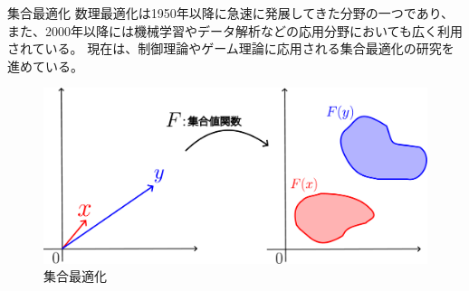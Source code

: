 \documentclass[aspectratio=169, dvipdfmx, 11pt]{beamer} %
\begin{document}
\begin{frame}{集合最適化}
  数理最適化は1950年以降に急速に発展してきた分野の一つであり、また、2000年以降には機械学習やデータ解析などの応用分野においても広く利用されている。
  現在は、制御理論やゲーム理論に応用される集合最適化の研究を進めている。
  \begin{figure}
    \centering
    \includegraphics[keepaspectratio, scale=0.10]{figures/eps/set_opt.eps}
    \caption{集合最適化}
  \end{figure}
\end{frame}
\end{document}
